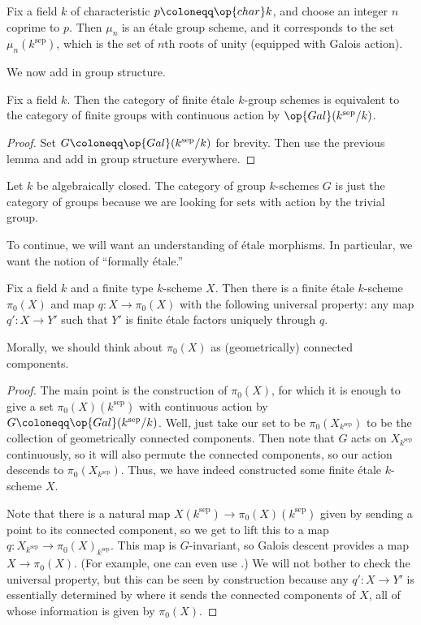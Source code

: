 \documentclass[../notes.tex]{subfiles}
\begin{document}
\begin{example}
	Fix a field $k$ of characteristic $p\coloneqq\op{char}k$, and choose an integer $n$ coprime to $p$. Then $\mu_n$ is an \'etale group scheme, and it corresponds to the set $\mu_n(k^{\mathrm{sep}})$, which is the set of $n$th roots of unity (equipped with Galois action).
\end{example}
We now add in group structure.
\begin{lemma}
	Fix a field $k$. Then the category of finite \'etale $k$-group schemes is equivalent to the category of finite groups with continuous action by $\op{Gal}(k^{\mathrm{sep}}/k)$.
\end{lemma}
\begin{proof}
	Set $G\coloneqq\op{Gal}(k^{\mathrm{sep}}/k)$ for brevity. Then use the previous lemma and add in group structure everywhere.
\end{proof}
\begin{example}
	Let $k$ be algebraically closed. The category of group $k$-schemes $G$ is just the category of groups because we are looking for sets with action by the trivial group.
\end{example}
To continue, we will want an understanding of \'etale morphisms. In particular, we want the notion of ``formally \'etale.''
\begin{proposition}
	Fix a field $k$ and a finite type $k$-scheme $X$. Then there is a finite \'etale $k$-scheme $\pi_0(X)$ and map $q\colon X\to\pi_0(X)$ with the following universal property: any map $q'\colon X\to Y'$ such that $Y'$ is finite \'etale factors uniquely through $q$.
\end{proposition}
Morally, we should think about $\pi_0(X)$ as (geometrically) connected components.
\begin{proof}
	The main point is the construction of $\pi_0(X)$, for which it is enough to give a set $\pi_0(X)(k^{\mathrm{sep}})$ with continuous action by $G\coloneqq\op{Gal}(k^{\mathrm{sep}}/k)$. Well, just take our set to be $\pi_0(X_{k^{\mathrm{sep}}})$ to be the collection of geometrically connected components. Then note that $G$ acts on $X_{k^{\mathrm{sep}}}$ continuously, so it will also permute the connected components, so our action descends to $\pi_0(X_{k^{\mathrm{sep}}})$. Thus, we have indeed constructed some finite \'etale $k$-scheme $X$.

	Note that there is a natural map $X(k^{\mathrm{sep}})\to\pi_0(X)(k^{\mathrm{sep}})$ given by sending a point to its connected component, so we get to lift this to a map $q\colon X_{k^{\mathrm{sep}}}\to\pi_0(X)_{k^{\mathrm{sep}}}$. This map is $G$-invariant, so Galois descent provides a map $X\to\pi_0(X)$. (For example, one can even use .) We will not bother to check the universal property, but this can be seen by construction because any $q'\colon X\to Y'$ is essentially determined by where it sends the connected components of $X$, all of whose information is given by $\pi_0(X)$.
\end{proof}
\end{document}
